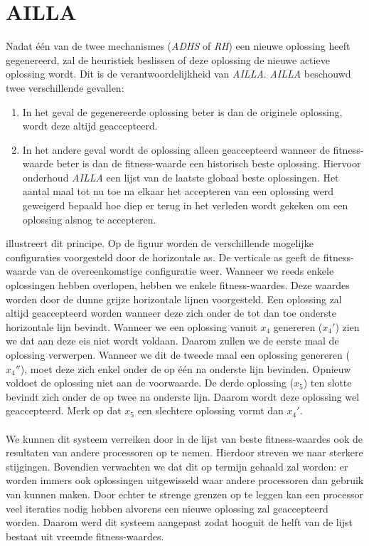\section{AILLA}
Nadat \'e\'en van de twee mechanismes (\emph{ADHS} of \emph{RH}) een nieuwe oplossing heeft gegenereerd, zal de heuristiek beslissen of deze oplossing de nieuwe actieve oplossing wordt. Dit is de verantwoordelijkheid van \emph{AILLA}. \emph{AILLA} beschouwd twee verschillende gevallen:
\begin{enumerate}
 \item In het geval de gegenereerde oplossing beter is dan de originele oplossing, wordt deze altijd geaccepteerd.
 \item In het andere geval wordt de oplossing alleen geaccepteerd wanneer de fitness-waarde beter is dan de fitness-waarde een historisch beste oplossing. Hiervoor onderhoud \emph{AILLA} een lijst van de laatste globaal beste oplossingen. Het aantal maal tot nu toe na elkaar het accepteren van een oplossing werd geweigerd bepaald hoe diep er terug in het verleden wordt gekeken om een oplossing alsnog te accepteren.
\end{enumerate}


 illustreert dit principe. Op de figuur worden de verschillende mogelijke configuraties voorgesteld door de horizontale as. De verticale as geeft de fitness-waarde van de overeenkomstige configuratie weer. Wanneer we reeds enkele oplossingen hebben overlopen, hebben we enkele fitness-waardes. Deze waardes worden door de dunne grijze horizontale lijnen voorgesteld. Een oplossing zal altijd geaccepteerd worden wanneer deze zich onder de tot dan toe onderste horizontale lijn bevindt. Wanneer we een oplossing vanuit $x_4$ genereren ($x_4'$) zien we dat aan deze eis niet wordt voldaan. Daarom zullen we de eerste maal de oplossing verwerpen. Wanneer we dit de tweede maal een oplossing genereren ($x_4''$), moet deze zich enkel onder de op \'e\'en na onderste lijn bevinden. Opnieuw voldoet de oplossing niet aan de voorwaarde. De derde oplossing ($x_5$) ten slotte bevindt zich onder de op twee na onderste lijn. Daarom wordt deze oplossing wel geaccepteerd. Merk op dat $x_5$ een slechtere oplossing vormt dan $x_4'$.

\paragraph{}
We kunnen dit systeem verreiken door in de lijst van beste fitness-waardes ook de resultaten van andere processoren op te nemen. Hierdoor streven we naar sterkere stijgingen. Bovendien verwachten we dat dit op termijn gehaald zal worden: er worden immers ook oplossingen uitgewisseld waar andere processoren dan gebruik van kunnen maken. Door echter te strenge grenzen op te leggen kan een processor veel iteraties nodig hebben alvorens een nieuwe oplossing zal geaccepteerd worden. Daarom werd dit systeem aangepast zodat hooguit de helft van de lijst bestaat uit vreemde fitness-waardes.